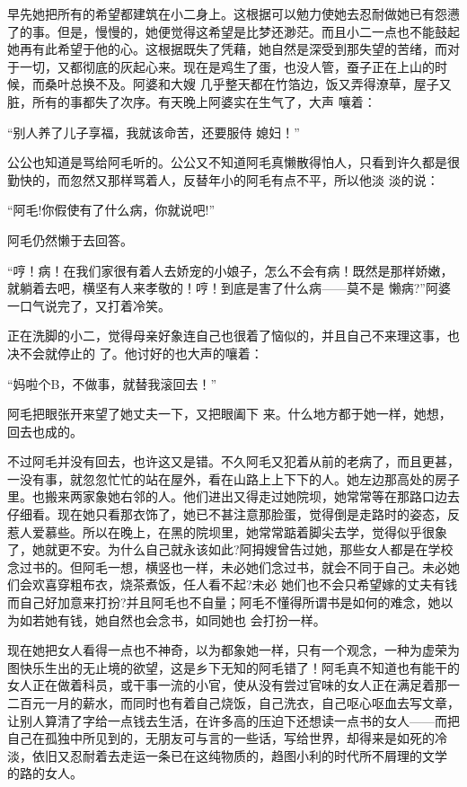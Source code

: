 \documentclass{article}
\begin{document}
早先她把所有的希望都建筑在小二身上。这根据可以勉力使她去忍耐做她已有怨懑了的事。但是，慢慢的，她便觉得这希望是比梦还渺茫。而且小二一点也不能鼓起她再有此希望于他的心。这根据既失了凭藉，她自然是深受到那失望的苦绪，而对于一切，又都彻底的灰起心来。现在是鸡生了蛋，也没人管，蚕子正在上山的时候，而桑叶总换不及。阿婆和大嫂
\newpage
几乎整天都在竹箔边，饭又弄得潦草，屋子又脏，所有的事都失了次序。有天晚上阿婆实在生气了，大声
嚷着： 

“别人养了儿子享福，我就该命苦，还要服侍
媳妇！” 

公公也知道是骂给阿毛听的。公公又不知道阿毛真懒散得怕人，只看到许久都是很勤快的，而忽然又那样骂着人，反替年小的阿毛有点不平，所以他淡
淡的说： 


“阿毛!你假使有了什么病，你就说吧!” 


阿毛仍然懒于去回答。 

“哼！病！在我们家很有着人去娇宠的小娘子，怎么不会有病！既然是那样娇嫩，就躺着去吧，横坚有人来孝敬的！哼！到底是害了什么病——莫不是
懒病?”阿婆一口气说完了，又打着冷笑。 

\newpage

正在洗脚的小二，觉得母亲好象连自己也很着了恼似的，并且自己不来理这事，也决不会就停止的
了。他讨好的也大声的嚷着： 


“妈啦个B，不做事，就替我滚回去！” 

阿毛把眼张开来望了她丈夫一下，又把眼阖下
来。什么地方都于她一样，她想，回去也成的。 

不过阿毛并没有回去，也许这又是错。不久阿毛又犯着从前的老病了，而且更甚，一没有事，就忽忽忙忙的站在屋外，看在山路上上下下的人。她左边那高处的房子里。也搬来两家象她右邻的人。他们进出又得走过她院坝，她常常等在那路口边去仔细看。现在她只看那衣饰了，她已不甚注意那脸蛋，觉得倒是走路时的姿态，反惹人爱慕些。所以在晚上，在黑的院坝里，她常常踮着脚尖去学，觉得似乎很象了，她就更不安。为什么自己就永该如此?阿拇嫂曾告过她，那些女人都是在学校念过书的。但阿毛一想，横竖也一样，未必她们念过书，就会不同于自己。未必她们会欢喜穿粗布衣，烧茶煮饭，任人看不起?未必
\newpage
她们也不会只希望嫁的丈夫有钱而自己好加意来打扮?并且阿毛也不自量；阿毛不懂得所谓书是如何的难念，她以为如若她有钱，她自然也会念书，如同她也
会打扮一样。 

现在她把女人看得一点也不神奇，以为都象她一样，只有一个观念，一种为虚荣为图快乐生出的无止境的欲望，这是乡下无知的阿毛错了！阿毛真不知道也有能干的女人正在做着科员，或干事一流的小官，使从没有尝过官味的女人正在满足着那一二百元一月的薪水，而同时也有着自己烧饭，自己洗衣，自己呕心呕血去写文章，让别人算清了字给一点钱去生活，在许多高的压迫下还想读一点书的女人——而把自己在孤独中所见到的，无朋友可与言的一些话，写给世界，却得来是如死的冷淡，依旧又忍耐着去走运一条已在这纯物质的，趋图小利的时代所不屑理的文学
的路的女人。 
\end{document}

